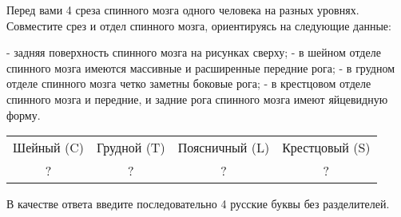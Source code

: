 
Перед вами 4 среза спинного мозга одного человека на разных уровнях. Совместите срез и отдел спинного мозга, ориентируясь на следующие данные:

- задняя поверхность спинного мозга на рисунках сверху;
- в шейном отделе спинного мозга имеются массивные и расширенные передние рога;
- в грудном отделе спинного мозга четко заметны боковые рога;
- в крестцовом отделе спинного мозга и передние, и задние рога спинного мозга имеют яйцевидную форму.



\begin{tabular}{|c|c|c|c|}
    \item Шейный (C) & Грудной (T) & Поясничный (L) & Крестцовый (S) \\
    \item ? & ? & ? & ? \\
\end{tabular}

В качестве ответа введите последовательно 4 русские буквы без разделителей.

